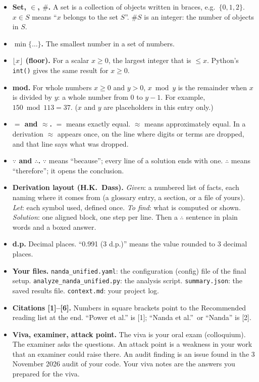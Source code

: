 \documentclass[11pt,a4paper,oneside,openany]{report}
\newcommand{\code}[1]{\texttt{#1}}
\newcommand{\gl}[1]{\textbf{#1}}   %
\newenvironment{glist}{\begin{itemize}\setlength{\itemsep}{2pt}\setlength{\parskip}{1pt}}{\end{itemize}}
\begin{document}
\begin{glist}
\item[\gl{A1}] \textbf{Set, $\in$, $\#$.} A set is a collection of objects written in braces, e.g.\ $\{0, 1, 2\}$. $x \in S$ means ``$x$ belongs to the set $S$''. $\#S$ is an integer: the number of objects in $S$.
\item[\gl{A2}] \textbf{$\min\{\ldots\}$.} The smallest number in a set of numbers.
\item[\gl{A3}] \textbf{$\lfloor x \rfloor$ (floor).} For a scalar $x \ge 0$, the largest integer that is $\le x$. Python's \code{int()} gives the same result for $x \ge 0$.
\item[\gl{A4}] \textbf{mod.} For whole numbers $x \ge 0$ and $y > 0$, $x \bmod y$ is the remainder when $x$ is divided by $y$: a whole number from $0$ to $y - 1$. For example, $150 \bmod 113 = 37$. ($x$ and $y$ are placeholders in this entry only.)
\item[\gl{A5}] \textbf{$=$ and $\approx$.} $=$ means exactly equal. $\approx$ means approximately equal. In a derivation $\approx$ appears once, on the line where digits or terms are dropped, and that line says what was dropped.
\item[\gl{A6}] \textbf{$\because$ and $\therefore$.} $\because$ means ``because''; every line of a solution ends with one. $\therefore$ means ``therefore''; it opens the conclusion.
\item[\gl{A7}] \textbf{Derivation layout (H.K.\ Dass).} \emph{Given}: a numbered list of facts, each naming where it comes from (a glossary entry, a section, or a file of yours). \emph{Let}: each symbol used, defined once. \emph{To find}: what is computed or shown. \emph{Solution}: one aligned block, one step per line. Then a $\therefore$ sentence in plain words and a boxed answer.
\item[\gl{A8}] \textbf{d.p.} Decimal places. ``0.991 (3 d.p.)'' means the value rounded to 3 decimal places.
\item[\gl{A9}] \textbf{Your files.} \code{nanda\_\allowbreak{}unified.yaml}: the configuration (config) file of the final setup. \code{analyze\_\allowbreak{}nanda\_\allowbreak{}unified.py}: the analysis script. \code{summary.json}: the saved results file. \code{context.md}: your project log.
\item[\gl{A10}] \textbf{Citations [1]--[6].} Numbers in square brackets point to the Recommended reading list at the end. ``Power et al.'' is [1]; ``Nanda et al.''\ or ``Nanda'' is [2].
\item[\gl{A11}] \textbf{Viva, examiner, attack point.} The viva is your oral exam (colloquium). The examiner asks the questions. An attack point is a weakness in your work that an examiner could raise there. An audit finding is an issue found in the 3 November 2026 audit of your code. Your viva notes are the answers you prepared for the viva.
\end{glist}
\end{document}
